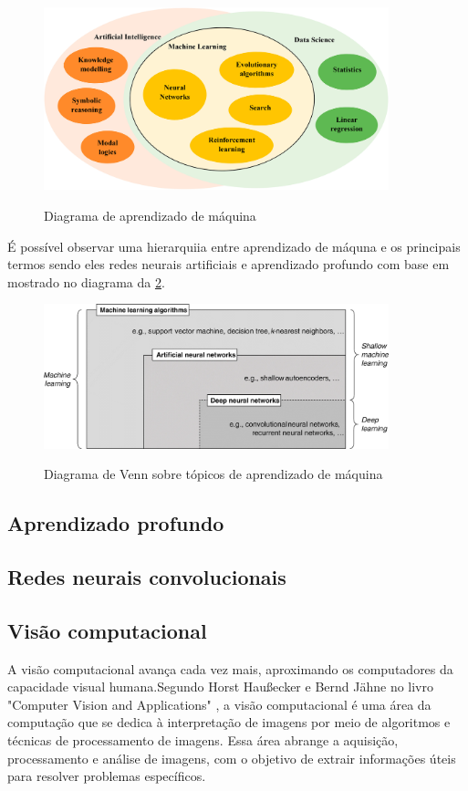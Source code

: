 \documentclass[
	12pt,				%
	openright,			%
	twoside,			%
	a4paper,			%
	english,			%
	french,				%
	spanish,			%
	brazil				%
	]{abntex2}
\begin{document}
\begin{figure}[H]
	\caption{Diagrama de aprendizado de máquina}
	\centering %
	\includegraphics[width=10cm]{figures/diagrama_ia.jpg} %
	\label{fig:diagrama_ia}
\end{figure}

É possível observar uma hierarquiia entre aprendizado de máquna e os principais termos sendo eles redes neurais artificiais e aprendizado profundo com base em  mostrado no diagrama da \cref{fig:diagrama_ann}.

\begin{figure}[H]
	\caption{Diagrama de Venn sobre tópicos de aprendizado de máquina}
	\centering %
	\includegraphics[width=10cm]{figures/diagrama_ann.jpg} %
	\label{fig:diagrama_ann}
\end{figure}	

\subsection{Aprendizado profundo}

\subsection{Redes neurais convolucionais}

\subsection{Visão computacional}
A visão computacional avança cada vez mais, aproximando os computadores da capacidade visual humana.Segundo Horst Haußecker e Bernd Jähne no livro "Computer Vision and Applications" \cite{comp_vision_and_applications}, a visão computacional é uma área da computação que se dedica à interpretação de imagens por meio de algoritmos e técnicas de processamento de imagens. Essa área abrange a aquisição, processamento e análise de imagens, com o objetivo de extrair informações úteis para resolver problemas específicos.
\end{document}
